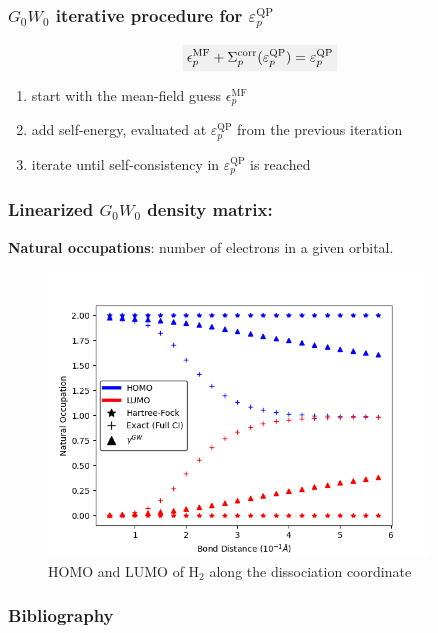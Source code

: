 \documentclass{beamer}
\newcommand{\highlight}[1]{\colorbox{caltechgray!10}{$\displaystyle#1$}}
\begin{document}
\begin{frame}
    \frametitle{\textcolor{caltechorange}{$G_0W_0$ iterative procedure \autocite{bruneval_assessment_2019} for $\varepsilon_{p}^{\mathrm{QP}}$}}
    \begin{equation}
\highlight{\epsilon_p^{\mathrm{MF}} + \Sigma_p^{\mathrm{corr}}(\varepsilon_p^{\mathrm{QP}}) = \varepsilon_p^{\mathrm{QP}}}
    \end{equation}
    \begin{enumerate}
        \item start with the mean-field guess $\epsilon_p^{\mathrm{MF}}$
        \item add self-energy, evaluated at $\varepsilon_p^{\mathrm{QP}}$ from the previous iteration
        \item iterate until self-consistency in $\varepsilon_p^{\mathrm{QP}}$ is reached
    \end{enumerate}

\end{frame}
\begin{frame}
    \frametitle{\textcolor{caltechorange}{Linearized $G_0W_0$ density matrix\autocite{bruneval_assessment_2019}:}}
\textbf{Natural occupations}:  number of electrons in a given orbital.\autocite{szabo_modern_2012}
\begin{figure}[h]
    \includegraphics[width=0.9\textwidth]{h2_occupations.png}
\caption{HOMO and LUMO of $\mathrm{H_2}$ along the dissociation coordinate}

\end{figure}
\end{frame}









\begin{frame}
    \frametitle{\textcolor{caltechorange}{Bibliography}}
    \printbibliography
\end{frame}
\end{document}
